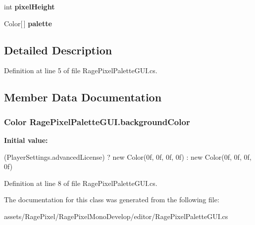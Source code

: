 \begin{DoxyCompactItemize}
\item 
\hypertarget{class_rage_pixel_palette_g_u_i_a56a4ec5d5849928c0c9ee1f46e5b276a}{int {\bfseries pixel\-Height}}\label{class_rage_pixel_palette_g_u_i_a56a4ec5d5849928c0c9ee1f46e5b276a}

\item 
\hypertarget{class_rage_pixel_palette_g_u_i_a2bb18bcea780d730cf2468e155c56a15}{Color\mbox{[}$\,$\mbox{]} {\bfseries palette}}\label{class_rage_pixel_palette_g_u_i_a2bb18bcea780d730cf2468e155c56a15}

\end{DoxyCompactItemize}


\subsection{Detailed Description}


Definition at line 5 of file Rage\-Pixel\-Palette\-G\-U\-I.\-cs.



\subsection{Member Data Documentation}
\hypertarget{class_rage_pixel_palette_g_u_i_a45f49ebe26add1ebd099b248d4803d76}{
\subsubsection[{background\-Color}]{\setlength{\rightskip}{0pt plus 5cm}Color Rage\-Pixel\-Palette\-G\-U\-I.\-background\-Color}}\label{class_rage_pixel_palette_g_u_i_a45f49ebe26add1ebd099b248d4803d76}
{\bfseries Initial value\-:}
\begin{DoxyCode}

                (PlayerSettings.advancedLicense) ?
                new Color(0f, 0f, 0f, 0f) :
                new Color(0f, 0f, 0f, 0f)
\end{DoxyCode}


Definition at line 8 of file Rage\-Pixel\-Palette\-G\-U\-I.\-cs.



The documentation for this class was generated from the following file\-:\begin{DoxyCompactItemize}
\item 
assets/\-Rage\-Pixel/\-Rage\-Pixel\-Mono\-Develop/editor/Rage\-Pixel\-Palette\-G\-U\-I.\-cs\end{DoxyCompactItemize}
